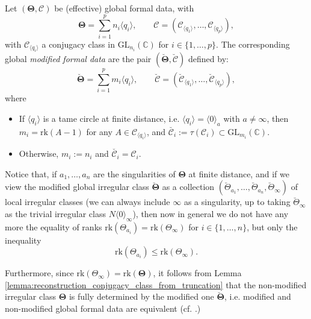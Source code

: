 \documentclass[11pt,a4paper]{amsart}
\numberwithin{equation}{section}
\newcommand{\cir}[1]{\langle #1 \rangle}
\begin{document}
\begin{definition}
Let $(\bm\Theta, \bm{\mathcal C})$ be (effective) global formal data, with
\[
\bm\Theta=\sum_{i=1}^p n_i\cir{q_i}, \qquad \bm{\mathcal C}=(\mathcal C_{\cir{q_1}}, \dots, \mathcal C_{\cir{q_p}}),
\]
with $\mathcal C_{\cir{q_i}}$ a conjugacy class in $\mathrm{GL}_{n_i}(\mathbb C)$ for $i\in \{1, \dots, p\}$.
The corresponding global \emph{modified formal data} are the pair $(\bm{\breve\Theta}, \breve{\bm{\mathcal C}})$ defined by:
\[
\bm{\breve\Theta}=\sum_{i=1}^p m_i\cir{q_i}, \qquad \breve{\bm{\mathcal C}}=(\breve{\mathcal C}_{\cir{q_1}}, \dots, \breve{\mathcal C}_{\cir{q_p}}),
\]
where
\begin{itemize}
\item If $\cir{q_i}$ is a tame circle at finite distance, i.e. $\cir{q_i}=\cir{0}_a$ with $a\neq\infty$, then $m_i=\mathrm{rk}(A-1)$ for any $A\in \mathcal C_{\cir{q_i}}$, and $\breve{\mathcal C_i}:=\tau(\mathcal C_i)\subset \mathrm{GL}_{m_i}(\mathbb C)$.
\item Otherwise, $m_i:=n_i$ and $\breve{\mathcal C_i}=\mathcal C_i$.
\end{itemize}
\end{definition}

Notice that, if $a_1, \dots, a_n$ are the singularities of $\bm{\Theta}$ at finite distance, and if we view the modified global irregular class $\bm{\breve{\Theta}}$ as a collection $(\breve\Theta_{a_1}, \dots, \breve\Theta_{a_n}, \breve\Theta_{\infty})$ of local irregular classes (we can always include $\infty$ as a singularity, up to taking $\breve\Theta_\infty$ as the trivial irregular class $N \cir{0}_\infty$), then now in general we do not have any more the equality of ranks $\mathrm{rk} (\Theta_{a_i})=\mathrm{rk}(\Theta_\infty)$ for $i\in \{1, \dots, n\}$, but only the inequality
\[
\mathrm{rk}(\Theta_{a_i})\leq\mathrm{rk}(\Theta_\infty).
\]

Furthermore, since $\mathrm{rk}(\Theta_\infty)=\mathrm{rk}(\bm\Theta)$, it follows from Lemma \ref{lemma:reconstruction_conjugacy_class_from_truncation} that the non-modified irregular class $\bm{\Theta}$ is fully determined by the modified one $\bm{\breve{\Theta}}$, i.e. modified and non-modified global formal data are equivalent (cf. \cite[Corollary 3.6]{arinkin2008fourier}.)
\end{document}
